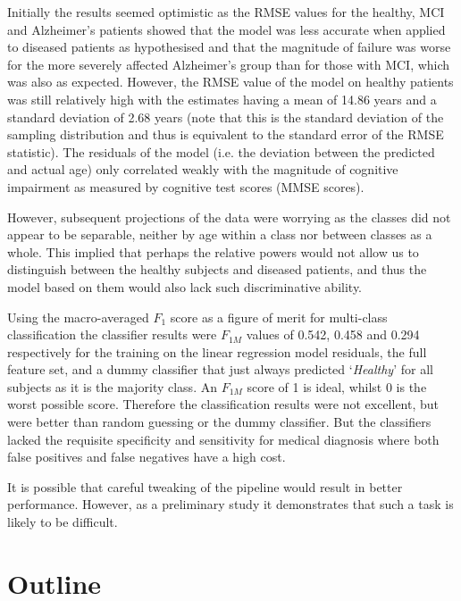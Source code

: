 Initially the results seemed optimistic as the RMSE values for the healthy, MCI and Alzheimer's patients showed that the model was less accurate when applied to diseased patients as hypothesised and that the magnitude of failure was worse for the more severely affected Alzheimer's group than for those with MCI, which was also as expected. However, the RMSE value of the model on healthy patients was still relatively high with the estimates having a mean of 14.86 years and a standard deviation of 2.68 years (note that this is the standard deviation of the sampling distribution and thus is equivalent to the standard error of the RMSE statistic). The residuals of the model (i.e. the deviation between the predicted and actual age) only correlated weakly with the magnitude of cognitive impairment as measured by cognitive test scores (MMSE scores).

However, subsequent projections of the data were worrying as the classes did not appear to be separable, neither by age within a class nor between classes as a whole. This implied that perhaps the relative powers would not allow us to distinguish between the healthy subjects and diseased patients, and thus the model based on them would also lack such discriminative ability. 

Using the macro-averaged $F_1$ score as a figure of merit for multi-class classification\cite{Sokolova2009} the classifier results were $F_{1M}$ values of 0.542, 0.458 and 0.294 respectively for the training on the linear regression model residuals, the full feature set, and a dummy classifier that just always predicted `\textit{Healthy}' for all subjects as it is the majority class. An $F_{1M}$ score of 1 is ideal, whilst 0 is the worst possible score. Therefore the classification results were not excellent, but were better than random guessing or the dummy classifier. But the classifiers lacked the requisite specificity and sensitivity for medical diagnosis where both false positives and false negatives have a high cost.

It is possible that careful tweaking of the pipeline would result in better performance. However, as a preliminary study it demonstrates that such a task is likely to be difficult.



\newpage

\section{Outline}

